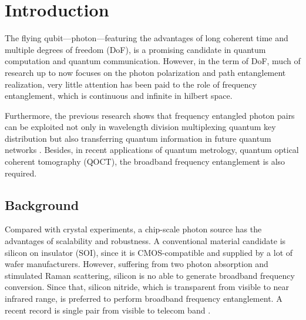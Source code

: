 \chapter{Introduction}

The flying qubit---photon---featuring the advantages of long coherent time and multiple degrees of freedom (DoF), is a promising candidate in quantum computation and quantum communication. However, in the term of DoF, much of research up to now focuses on the photon polarization and path entanglement realization, very little attention has been paid to the role of frequency entanglement, which is continuous and infinite in hilbert space. 

Furthermore, the previous research shows that frequency entangled photon pairs can be exploited not only in wavelength division multiplexing quantum key distribution \cite{Wengerowsky2018} but also transferring quantum information in future quantum networks \cite{Tchebotareva2019}. Besides, in recent applications of quantum metrology, quantum optical coherent tomography (QOCT), the broadband frequency entanglement \cite{Okano2015} is also required. 

\section{Background}

Compared with crystal experiments, a chip-scale photon source has the advantages of scalability and robustness. A conventional material candidate is silicon on insulator (SOI), since it is CMOS-compatible and supplied by a lot of wafer manufacturers. However, suffering from two photon absorption and stimulated Raman scattering, silicon is no able to generate broadband frequency conversion. Since that, silicon nitride, which is transparent from visible to near infrared range, is preferred to perform broadband frequency entanglement. A recent record is single pair from visible to telecom band \cite{Lu2016}.

